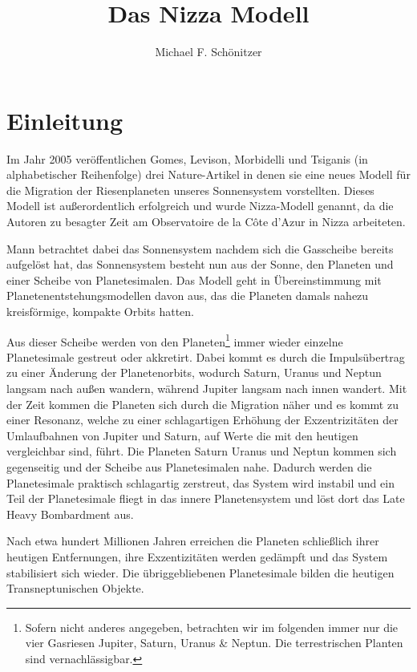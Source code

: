 \documentclass[10pt,a4paper,twoside]{article}
\author{Michael F. Schönitzer}
\title{Das Nizza Modell}
\begin{document}
\maketitle

\section{Einleitung}
Im Jahr 2005 veröffentlichen Gomes, Levison, Morbidelli und Tsiganis (in alphabetischer Reihenfolge) drei Nature-Artikel\cite{Gomes2005}\cite{Tsiganis2005}\cite{Morbidelli2005} %
in denen sie eine neues Modell für die Migration der Riesenplaneten unseres Sonnensystem vorstellten. Dieses Modell ist außerordentlich erfolgreich und wurde Nizza-Modell genannt, da die Autoren zu besagter Zeit am Observatoire de la Côte d’Azur in Nizza arbeiteten.

Mann betrachtet dabei das Sonnensystem nachdem sich die Gasscheibe bereits aufgelöst hat, das Sonnensystem besteht nun aus der Sonne, den Planeten und einer Scheibe von Planetesimalen. Das Modell geht in Übereinstimmung mit Planetenentstehungsmodellen %
davon aus, das die Planeten damals nahezu kreisförmige, kompakte Orbits hatten.

Aus dieser Scheibe werden von den Planeten\footnote{Sofern nicht anderes angegeben, betrachten wir im folgenden immer nur die vier Gasriesen Jupiter, Saturn, Uranus \& Neptun. Die terrestrischen Planten sind vernachlässigbar.} immer wieder einzelne Planetesimale gestreut oder akkretirt. Dabei kommt es durch die Impulsübertrag zu einer Änderung der Planetenorbits\cite{Tsiganis2005},
wodurch Saturn, Uranus und Neptun langsam nach außen wandern, während Jupiter langsam nach innen wandert.\cite{Tsiganis2005}\cite{Hahn1999} %
Mit der Zeit kommen die Planeten sich durch die Migration näher und es kommt zu einer Resonanz,
welche zu einer schlagartigen Erhöhung der Exzentrizitäten der Umlaufbahnen von Jupiter und Saturn, auf Werte die mit den heutigen vergleichbar sind, führt.
Die Planeten Saturn Uranus und Neptun kommen sich gegenseitig und der Scheibe aus Planetesimalen nahe. Dadurch werden die Planetesimale praktisch schlagartig zerstreut, das System wird instabil und ein Teil der Planetesimale fliegt in das innere Planetensystem und löst dort das Late Heavy Bombardment aus.

Nach etwa hundert Millionen Jahren erreichen die Planeten schließlich ihrer heutigen Entfernungen, ihre Exzentizitäten werden gedämpft und das System stabilisiert sich wieder. Die übriggebliebenen Planetesimale bilden die heutigen Transneptunischen Objekte.
\end{document}
